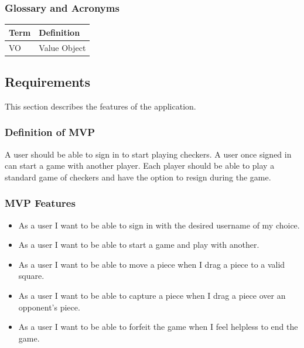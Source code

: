 \hypertarget{glossary-and-acronyms}{%
\subsubsection{Glossary and Acronyms}\label{glossary-and-acronyms}}

\begin{longtable}[]{@{}ll@{}}
\toprule
Term & Definition \\
\midrule
\endhead
VO & Value Object \\
\bottomrule
\end{longtable}

\hypertarget{requirements}{%
\subsection{Requirements}\label{requirements}}

This section describes the features of the application.

\hypertarget{definition-of-mvp}{%
\subsubsection{Definition of MVP}\label{definition-of-mvp}}

A user should be able to sign in to start playing checkers. A user once
signed in can start a game with another player. Each player should be
able to play a standard game of checkers and have the option to resign
during the game.

\hypertarget{mvp-features}{%
\subsubsection{MVP Features}\label{mvp-features}}

\begin{itemize}
\tightlist
\item
  As a user I want to be able to sign in with the desired username of my
  choice.
\item
  As a user I want to be able to start a game and play with another.
\item
  As a user I want to be able to move a piece when I drag a piece to a
  valid square.
\item
  As a user I want to be able to capture a piece when I drag a piece
  over an opponent's piece.
\item
  As a user I want to be able to forfeit the game when I feel helpless
  to end the game.
\end{itemize}

